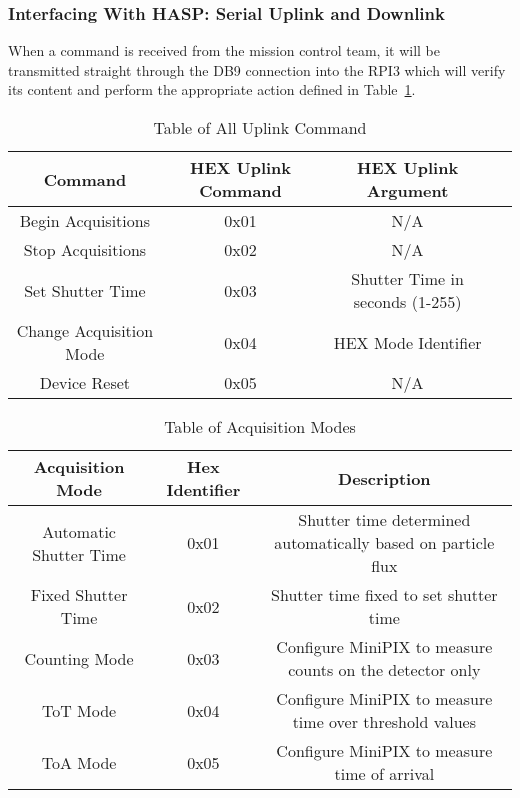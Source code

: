 \subsubsection{Interfacing With HASP: Serial Uplink and Downlink}

When a command is received from the mission control team, it will be transmitted straight through the DB9 connection into the RPI3 which will verify its content and perform the appropriate action defined in Table~\ref{tab:All-Commands}. 

\begin{table}[!ht]
\centering
\caption{Table of All Uplink Command} 
\label{tab:All-Commands}
\bigskip
\begin{tabular}{|c|c|c|c|}
\hline
\multicolumn{1}{|c|}{\bfseries Command} & \multicolumn{1}{c|}{\bfseries HEX Uplink Command} & \multicolumn{1}{c|}{\bfseries HEX Uplink Argument}\\
\hline
    Begin Acquisitions 		& 0x01	 & N/A			    	    \\ \hline 
    Stop Acquisitions 		& 0x02	 & N/A			            \\ \hline
    Set Shutter Time		& 0x03   & Shutter Time in seconds (1-255)  \\ \hline %
    Change Acquisition Mode    	& 0x04 	 & HEX Mode Identifier 	            \\ \hline
    Device Reset		& 0x05 	 & N/A				    \\ \hline
    
\end{tabular}
\medskip
\end{table}

\begin{table}[!ht]
\centering
\caption{Table of Acquisition Modes} 
\label{tab:Acq-Commands}
\bigskip
\begin{tabular}{|c|c|c|}
\hline
\multicolumn{1}{|c|}{\bfseries Acquisition Mode} & \multicolumn{1}{c|}{\bfseries Hex Identifier} & \multicolumn{1}{c|}{\bfseries Description}\\
\hline
    Automatic Shutter Time	& 0x01   & Shutter time determined automatically based on particle flux   \\ \hline %
    Fixed Shutter Time    	& 0x02 	 & Shutter time fixed to set shutter time 	     		  \\ \hline
    Counting Mode    		& 0x03 	 & Configure MiniPIX to measure counts on the detector only 	  \\ \hline
    ToT Mode			& 0x04	 & Configure MiniPIX to measure time over threshold values	  \\ \hline
    ToA Mode			& 0x05 	 & Configure MiniPIX to measure time of arrival 	     	  \\ \hline
\end{tabular}
\medskip
\end{table}


